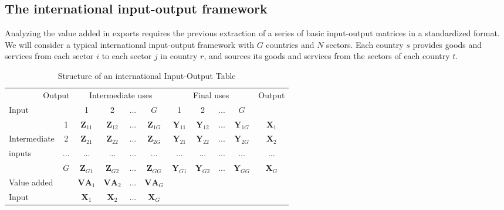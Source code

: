 \hypertarget{the-international-input-output-framework}{%
\subsection{The international input-output framework}\label{the-international-input-output-framework}}

Analyzing the value added in exports requires the previous extraction of a
series of basic input-output matrices in a standardized format. We will consider
a typical international input-output framework with \(G\) countries and \(N\)
sectors. Each country \(s\) provides goods and services from each sector \(i\) to
each sector \(j\) in country \(r\), and sources its goods and services from the
sectors of each country \(t\).

\begin{table}[h]
    \centering
    \caption{\label{tab:iot}Structure of an international Input-Output Table}
    \begin{tabular}{|lc|c|c|c|c|c|c|c|c|c|}
        \hline
        \multicolumn{2}{|r|}{Output}
        & \multicolumn{4}{|c|}{Intermediate uses}
        & \multicolumn{4}{|c|}{Final uses}
        & Output \\ \cline{3-10}
        \multicolumn{2}{|l|}{Input} & 1 & 2 & ... & $G$
        & 1 & 2 & ... & $G$ & ~ \\ \hline
        ~ & 1 & $\mathbf{Z}_{11}$ & $\mathbf{Z}_{12}$ & ... & $\mathbf{Z}_{1G}$ &
        $\mathbf{Y}_{11}$ & $\mathbf{Y}_{12}$ & ... & $\mathbf{Y}_{1G}$
        & $\mathbf{X}_{1}$ \\
        Intermediate & 2 &
        $\mathbf{Z}_{21}$ & $\mathbf{Z}_{22}$ & ... & $\mathbf{Z}_{2G}$ &
        $\mathbf{Y}_{21}$ & $\mathbf{Y}_{22}$ & ... & $\mathbf{Y}_{2G}$ &
        $\mathbf{X}_{2}$ \\
        inputs & ... & ... & ... & ... & ... & ... & ... & ... & ... & ... \\
        ~ & $G$ & $\mathbf{Z}_{G1}$ & $\mathbf{Z}_{G2}$ & ... & $\mathbf{Z}_{GG}$
        & $\mathbf{Y}_{G1}$ & $\mathbf{Y}_{G2}$ & ... & $\mathbf{Y}_{GG}$ &
        $\mathbf{X}_{G}$ \\ \hline
        Value added & ~ & $\mathbf{VA}_{1}$ & $\mathbf{VA}_{2}$ & ... &
        $\mathbf{VA}_{G}$ \\ \cline{1-6}
        Input & ~ & $\mathbf{X}_{1}$ & $\mathbf{X}_{2}$ & ...
        & $\mathbf{X}_{G}$  \\ \cline{1-6}
    \end{tabular}
\end{table}

